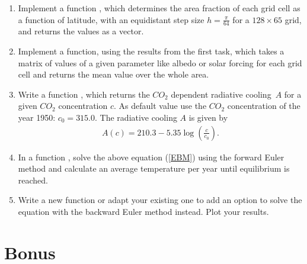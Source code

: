 \documentclass[10pt]{scrartcl}
\begin{document}
\begin{enumerate}
\item Implement a function \small\texttt{}\normalsize, which determines the area fraction of each grid cell as a function of latitude, with an equidistant step size $h=\frac{\pi}{64}$ for a $128 \times 65$ grid, and returns the values as a vector.
\item Implement a \small\texttt{} \normalsize function, using the results from the first task, which takes a matrix of values of a given parameter like albedo or solar forcing for each grid cell and returns the mean value over the whole area.
\item Write a function \small\texttt{}\normalsize, which returns the $CO_2$ dependent radiative cooling~$A$ for a given $CO_2$ concentration $c$. As default value use the $CO_2$ concentration of the year 1950: $c_0 = 315.0$. The radiative cooling $A$ is given by
\begin{align}
A (c) = 210.3-5.35 \log\left(\frac{c}{c_0}\right).
\label{A}
\end{align}
\item In a function \small\texttt{}\normalsize, solve the above equation (\ref{EBM}) using the forward Euler method and calculate an average temperature per year until equilibrium is reached.
\item Write a new function or adapt your existing one to add an option to solve the equation with the backward Euler method instead. Plot your results.

\end{enumerate}



 \section{Bonus}
\end{document}
